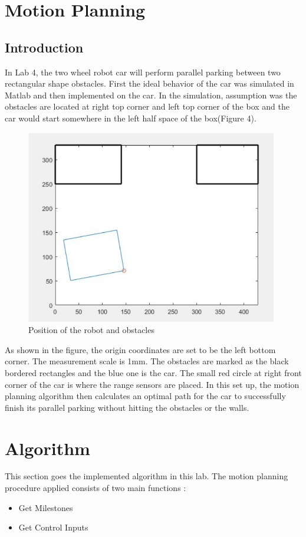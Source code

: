 \documentclass[12pt, letterpaper]{amsart} %
\numberwithin{equation}{section}
\begin{document}
\section{Motion Planning}
\subsection{Introduction}
In Lab 4, the two wheel robot car will perform parallel parking between two rectangular shape obstacles. First the ideal behavior of the car was simulated in Matlab and then implemented on the car.
In the simulation, assumption was the obstacles are located at right top corner and left top corner of the box and the car would start somewhere in the left half space of the box(Figure 4).

\begin{figure}[h!]
\includegraphics[width=110mm]{./img/fig_4.png}
\caption{Position of the robot and obstacles}
\label{fig:figure4}
\end{figure}

As shown in the figure, the origin coordinates are set to be the left bottom corner. The measurement scale is 1mm. The obstacles are marked as the black bordered rectangles and the blue one is the car. The small red circle at right front corner of the car is where the range sensors are placed.  
In this set up, the motion planning algorithm then calculates an optimal path for the car to 
successfully finish its parallel parking
without hitting the obstacles or the walls.

\newpage 
\section{Algorithm}
This section goes the implemented algorithm in this lab. The motion planning procedure applied consists of two main functions : 
\begin{itemize}
	\item Get Milestones
	\item Get Control Inputs 
\end{itemize}
\end{document}
